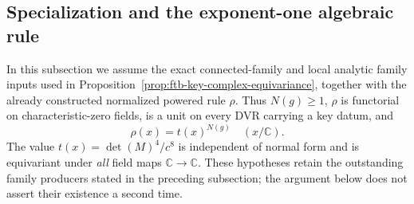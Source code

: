 \subsection{Specialization and the exponent-one algebraic rule}
\label{subsec:ftb-key-specialization-descent}

In this subsection we assume the exact connected-family and local
analytic family inputs used in
Proposition~\ref{prop:ftb-key-complex-equivariance}, together with
the already constructed normalized powered rule \(\rho\).
Thus \(N(g)\ge1\), \(\rho\) is functorial on characteristic-zero
fields, is a unit on every DVR carrying a key datum, and
\[
                             \rho(x)=t(x)^{N(g)}
                                      \quad(x/\mathbb C).
 \tag{S1}\label{eq:ftb-key-powered-normal-value}
\]
The value \(t(x)=\det(M)^4/c^8\) is independent of normal form and
is equivariant under \emph{all} field maps
\(\mathbb C\to\mathbb C\).
These hypotheses retain the outstanding family producers stated
in the preceding subsection; the argument below does not assert
their existence a second time.

